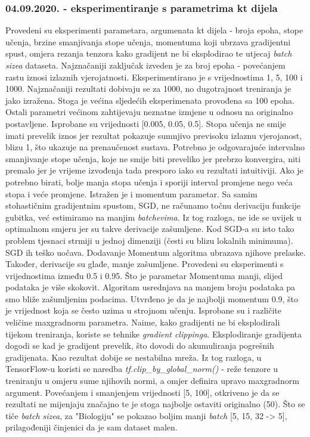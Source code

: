 \subsubsection{04.09.2020. - eksperimentiranje s parametrima kt dijela}
Provedeni su eksperimenti parametara, argumenata kt dijela - broja epoha, stope učenja, brzine smanjivanja stope učenja, momentuma koji ubrzava gradijentni spust, omjera rezanja tenzora kako gradijent ne bi eksplodirao te utjecaj \textit{batch sizea} dataseta.\newline
Najznačaniji zaključak izveden je za broj epoha - povećanjem rastu iznosi izlaznih vjerojatnosti. Eksperimentirano je s vrijednostima 1, 5, 100 i 1000. Najznačaniji rezultati dobivaju se za 1000, no dugotrajnost treniranja je jako izražena. Stoga je većina sljedećih eksperimenata provođena sa 100 epoha. Ostali parametri većinom zahtijevaju neznatne izmjene u odnosu na originalno postavljene.\newline
Isprobane su vrijednosti [0.005, 0.05, 0.5]. Stopa učenja ne smije imati prevelik iznos jer rezultat pokazuje sumnjivo previsoku izlaznu vjerojanost, blizu 1, što ukazuje na prenaučenost sustava. Potrebno je odgovarajuće intervalno smanjivanje stope učenja, koje ne smije biti preveliko jer prebrzo konvergira, niti premalo jer je vrijeme izvođenja tada presporo iako su rezultati intuitiviji. Ako je potrebno birati, bolje manja stopa učenja i sporiji interval promjene nego veća stopa i veće promjene.\newline
Istražen je i momentum parametar. Sa samim stohastičnim gradijentnim spustom, SGD, ne računamo točnu derivaciju funkcije gubitka, već estimiramo na manjim \textit{batchevima}. Iz tog razloga, ne ide se uvijek u optimalnom smjeru jer su takve derivacije zašumljene. Kod SGD-a su isto tako problem tjesnaci strmiji u jednoj dimenziji (česti su blizu lokalnih minimuma). SGD ih teško uočava. Dodavanje Momentum algoritma ubrazava njihove prelaske. Također, derivacije su glađe, manje zašumljene. Provedeni su eksperimenti s vrijednostima između 0.5 i 0.95. Što je parametar Momentuma manji, slijed podataka je više skokovit. Algoritam usrednjava na manjem broju podataka pa smo bliže zašumljenim podacima. Utvrđeno je da je najbolji momentum 0.9, što je vrijednost koja se često uzima u strojnom učenju.\newline
Isprobane su i različite veličine maxgradnorm parametra. Naime, kako gradijenti ne bi eksplodirali tijekom treniranja, koriste se tehnike \textit{gradient clippinga}. Eksplodiranje gradijenta dogodi se kad je gradijent prevelik, što dovodi do akumuliranja pogrešnih gradijenata. Kao rezultat dobije se nestabilna mreža. Iz tog razloga, u TensorFlow-u koristi se naredba \textit{tf.clip\_by\_global\_norm()} - reže tenzore u treniranju u omjeru sume njihovih normi, a omjer definira upravo maxgradnorm argument. Povećanjem i smanjenjem vrijednosti [5, 100], otkriveno je da se rezultati ne mijenjaju značajno te je stoga najbolje ostaviti originalno (50). \newline
Što se tiče \textit{batch sizea}, za "Biologiju" se pokazao boljim manji \textit{batch} [5, 15, 32 -> 5], prilagođeniji činjenici da je sam dataset malen. 

